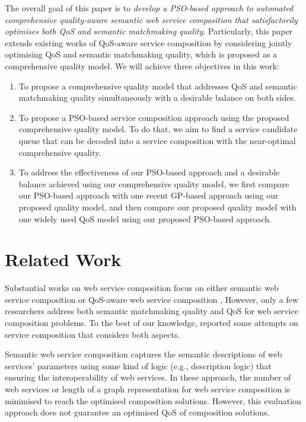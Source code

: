 \documentclass{llncs}
\begin{document}
The overall goal of this paper is to \textit{develop a PSO-based approach to automated comprehensive quality-aware semantic web service composition that satisfactorily optimises both QoS and semantic matchmaking quality}. Particularly, this paper extends existing works of QoS-aware service composition by considering jointly optimising QoS and semantic matchmaking quality, which is proposed as a comprehensive quality model. We will achieve three objectives in this work:

\begin{enumerate}
 \item To propose a comprehensive quality model that addresses QoS and semantic matchmaking quality simultaneously with a desirable balance on both sides.
  
 \item To propose a PSO-based service composition approach using the proposed comprehensive quality model. To do that, we aim to find a service candidate queue that can be decoded into a service composition with the near-optimal comprehensive quality.  
 \item To address the effectiveness of our PSO-based approach and a desirable balance achieved using our comprehensive quality model, we first compare our PSO-based approach with one recent GP-based approach \cite{ma2015hybrid} using our proposed quality model, and then compare our proposed quality model with one widely used QoS model using our proposed PSO-based approach.
\end{enumerate}
\vspace{-0.5cm}
\section{Related Work} \label{relatedWork}
Substantial works on web service composition focus on either semantic web service composition \cite{bansal2016generalized,boustil2014semantic,mier2015integrated} or QoS-aware web service composition \cite{gupta2015optimization,ma2015hybrid,qi2010combining,da2016particle,da2015graphevol,yu2013adaptive}, However, only a few researchers address both semantic matchmaking quality and QoS for web service composition problems. To the best of our knowledge, \cite{fanjiang2014semantic,lecue2009optimizing,pop2009immune} reported some attempts on service composition that considers both aspects.

Semantic web service composition \cite{bansal2016generalized,boustil2014semantic,mier2015integrated} captures the semantic descriptions of web services' parameters using some kind of logic (e.g., description logic) that ensuring the interoperability of web services. In these approach, the number of web services or length of a graph representation for web service composition is minimised to reach the optimised composition solutions. However, this evaluation approach does not guarantee an optimised QoS of composition solutions.
\end{document}
